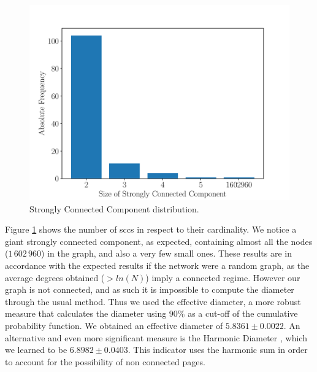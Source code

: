 \documentclass[9pt,a4paper,twocolumn,notitlepage]{article}
\begin{document}
\begin{figure}[h]
	\centering
	\includegraphics[width=\linewidth]{wikipedia_pt_sccdistr.pdf}
	\caption{Strongly Connected Component distribution.}
	\label{fig:sccdist}
\end{figure}

Figure \ref{fig:sccdist} shows the number of \acrshort{scc}s in respect to their cardinality. We notice a giant strongly connected component, as expected, containing almost all the nodes ($1\,602\,960$) in the graph, and also a very few small ones. These results are in accordance with the expected results if the network were a random graph, as the average degrees obtained ($> ln(N)$) imply a connected regime. However our graph is not connected, and as such it is impossible to compute the diameter through the usual method. Thus we used the effective diameter, a more robust measure that calculates the diameter using $90\%$ as a cut-off of the cumulative probability function. We obtained an effective diameter of $5.8361 \pm 0.0022$. An alternative and even more significant measure is the Harmonic Diameter \cite{fogaras}, which we learned to be $6.8982 \pm 0.0403$. This indicator uses the harmonic sum in order to account for the possibility of non connected pages.
\end{document}
